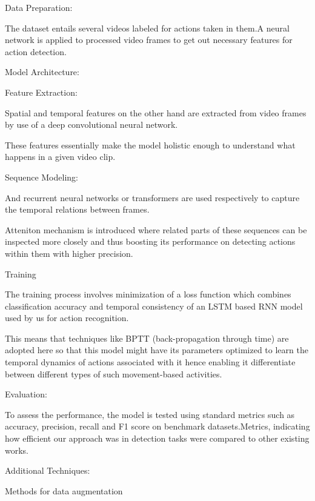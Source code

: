 {Data Preparation:

The dataset entails several videos labeled for actions taken in them.A neural network is applied to processed video frames to get out necessary features for action detection.

Model Architecture:

Feature Extraction:

Spatial and temporal features on the other hand are extracted from video frames by use of a deep convolutional neural network.

These features essentially make the model holistic enough to understand what happens in a given video clip.

Sequence Modeling:

And recurrent neural networks or transformers are used respectively to capture the temporal relations between frames.

Atteniton mechanism is introduced where related parts of these sequences can be inspected more closely and thus boosting its performance on detecting actions within them with higher precision.

Training

The training process involves minimization of a loss function which combines classification accuracy and temporal consistency of an LSTM based RNN model used by us for action recognition.

This means that techniques like BPTT (back-propagation through time) are adopted here so that this model might have its parameters optimized to learn the temporal dynamics of actions associated with it hence enabling it differentiate between different types of such movement-based activities.

Evaluation:

To assess the performance, the model is tested using standard metrics such as accuracy, precision, recall and F1 score on benchmark datasets.Metrics, indicating how efficient our approach was in detection tasks were compared to other existing works.

Additional Techniques:

Methods for data augmentation
}


